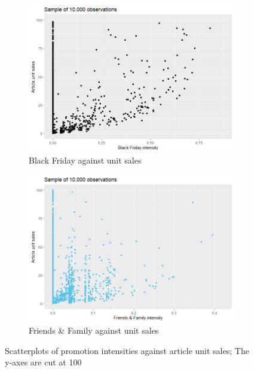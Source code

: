  \begin{figure}[H]
\centering
\begin{subfigure}{.45\textwidth}
  \centering
  \includegraphics[width=\linewidth]{figures/bf_against_sales.png}
  \caption{Black Friday against unit sales}
  \label{fig:bf_against_sales}
\end{subfigure}
\begin{subfigure}{.45\textwidth}
  \centering
  \includegraphics[width=\linewidth]{figures/ff_against_sales.png}
  \caption{Friends \& Family against unit sales}
  \label{fig:ff_against_sales}
\end{subfigure}
\caption{Scatterplots of promotion intensities against article unit sales; The y-axes are cut at 100}
\label{fig:promos_against_sales}
\end{figure}



